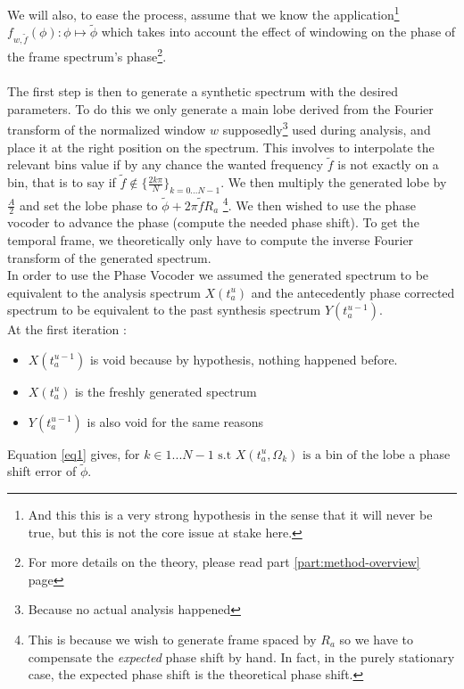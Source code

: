 \documentclass[]{article}
\begin{document}
We will also, to ease the process, assume that we know the application\footnote{And this this is a very strong hypothesis in the sense that it will never be true, but this is not the core issue at stake here.} ${f_{w, \tilde{f}}(\phi) : \phi \mapsto \tilde{\phi}}$ which takes into account the effect of windowing on the phase of the frame spectrum's phase\footnote{For more details on the theory, please read part \ref{part:method-overview} page \pageref{part:method-overview}}.\\ \\
The first step is then to generate a synthetic spectrum with the desired parameters. To do this we only generate a main lobe derived from the Fourier transform of the normalized window $w$ supposedly\footnote{Because no actual analysis happened} used during analysis, and place it at the right position on the spectrum. This involves to interpolate the relevant bins value if by any chance the wanted frequency $\tilde{f}$ is not exactly on a bin, that is to say if $\tilde{f} \notin \{\frac{2 k \pi}{N} \}_{k=0...N-1}$. We then multiply the generated lobe by $\frac{A}{2}$ and set the lobe phase to $\tilde{\phi} + 2\pi \tilde{f} R_a$    \footnote{This is because we wish to generate frame spaced by $R_a$ so we have to compensate the \emph{expected} phase shift by hand. In fact, in the purely stationary case, the expected phase shift is the theoretical phase shift.}. We then wished to use the phase vocoder to advance the phase (compute the needed phase shift). To get the temporal frame, we theoretically only have to compute the inverse Fourier transform of the generated spectrum.\\
In order to use the Phase Vocoder we assumed the generated spectrum to be equivalent to the analysis spectrum $X(t_a^u)$ and the antecedently phase corrected spectrum to be equivalent to the past synthesis spectrum $Y(t_a^{u-1})$.\\
At the first iteration :
\begin{itemize}
	\item $X(t_a^{u-1})$ is void because by hypothesis, nothing happened before.
	\item $X(t_a^u)$ is the freshly generated spectrum
	\item $Y(t_a^{u-1})$ is also void for the same reasons
\end{itemize}
Equation \ref{eq1} gives, for $k \in {1...N-1} \text{ s.t } X(t_a^{u}, \Omega_k) \text{ is a bin of the lobe}$ a phase shift error of $\tilde{\phi}$.\\
\end{document}
